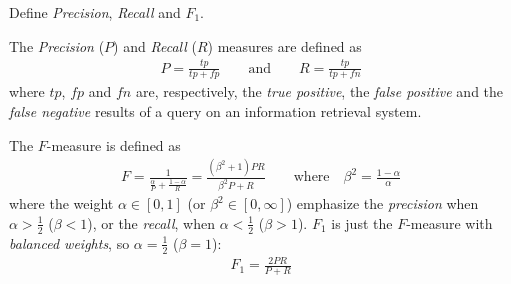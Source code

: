 \exercise

Define \emph{Precision}, \emph{Recall} and $F_1$.

\solution

The \emph{Precision} ($P$) and \emph{Recall} ($R$) measures are defined as
%
\begin{align*}
  P = \frac{tp}{tp + fp}\quad\quad \text{and} \quad\quad R = \frac{tp}{tp + fn}
\end{align*}
%
where $tp$, $fp$ and $fn$ are, respectively, the \emph{true positive}, the
\emph{false positive} and the \emph{false negative} results of a query on an
information retrieval system.

The $F$-measure is defined as
%
\begin{align*}
  F = \frac{1}{\frac{\alpha}{P} + \frac{1 - \alpha}{R}} =
  \frac{(\beta^2 + 1)PR}{\beta^2P + R}\quad\quad \text{where} \quad
  \beta^2 = \frac{1 - \alpha}{\alpha}
\end{align*}
%
where the weight $\alpha \in \left[ 0, 1 \right]$ (or $\beta^2 \in \left[ 0, \infty \right]$) emphasize the \emph{precision} when
$\alpha > \frac{1}{2}$ ($\beta < 1$), or the \emph{recall}, when $\alpha <
\frac{1}{2}$ ($\beta > 1$). $F_1$ is just the $F$-measure with \emph{balanced
weights}, so $\alpha = \frac{1}{2}$ ($\beta = 1$):
%
\begin{align*}
  F_1 = \frac{2PR}{P + R}
\end{align*}
